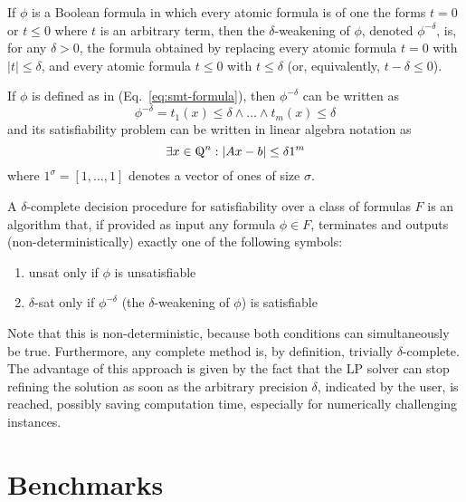 \documentclass[runningheads]{llncs}
\begin{document}
\begin{definition}
    If $\phi$ is a Boolean formula in which every atomic formula is of one the forms $t = 0$ or $t \le 0$ where $t$ is an arbitrary term, then the $\delta$-weakening of $\phi$, denoted $\phi^{-\delta}$, is, for any $\delta > 0$, the formula obtained by replacing every atomic formula $t = 0$ with $|t| \le \delta$, and every atomic formula $t \le 0$ with $t \le \delta$ (or, equivalently, $t - \delta \le 0$).
\end{definition}
If $\phi$ is defined as in (Eq.~\ref{eq:smt-formula}), then $\phi^{-\delta}$ can be written as
\begin{equation*}
    \phi^{-\delta} = t_1(x) \le \delta \land \ldots \land t_m(x) \le \delta
\end{equation*}
and its satisfiability problem can be written in linear algebra notation as
\begin{equation}
    \label{eq:delta-sat}
    \exists x \in \bbbq^n : |Ax - b| \le \delta 1^m
\end{equation}
where $1^\sigma = [1, \ldots, 1]$ denotes a vector of ones of size $\sigma$.
\begin{definition}
    A $\delta$-complete decision procedure for satisfiability over a class of formulas $F$ is an algorithm that, if provided as input any formula $\phi \in F$, terminates and outputs (non-deterministically) exactly one of the following symbols:
    \begin{enumerate}
        \item unsat only if $\phi$ is unsatisfiable
        \item $\delta$-sat only if $\phi^{-\delta}$ (the $\delta$-weakening of $\phi$) is satisfiable
    \end{enumerate}
\end{definition}
Note that this is non-deterministic, because both conditions can simultaneously be true.
Furthermore, any complete method is, by definition, trivially $\delta$-complete.
The advantage of this approach is given by the fact that the LP solver can stop refining the solution as soon as the arbitrary precision $\delta$, indicated by the user, is reached, possibly saving computation time, especially for numerically challenging instances.

\section{Benchmarks}
\end{document}
